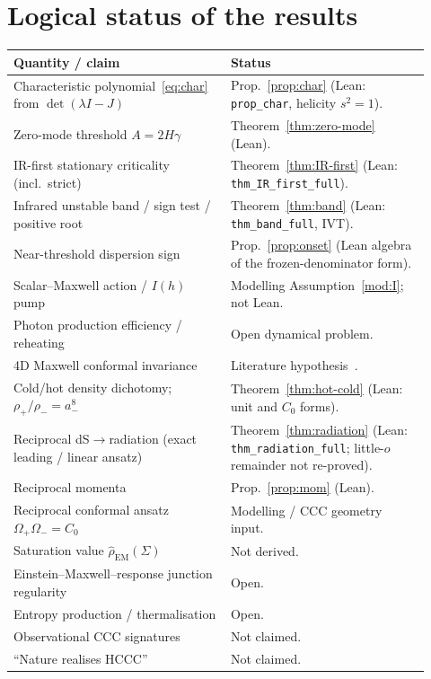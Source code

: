 \documentclass[11pt]{article}
\theoremstyle{definition}
\theoremstyle{remark}
\begin{document}
\section{Logical status of the results}
\label{sec:status}
\begin{center}
\small
\begin{tabular}{@{}p{0.48\linewidth}p{0.44\linewidth}@{}}
\toprule
\textbf{Quantity / claim} & \textbf{Status}\\
\midrule
Characteristic polynomial~\eqref{eq:char} from $\det(\lambda I-J)$ & Prop.~\ref{prop:char} (Lean: \texttt{prop\_char}, helicity $s^2=1$).\\
Zero-mode threshold $A=2H\gamma$ & Theorem~\ref{thm:zero-mode} (Lean).\\
IR-first stationary criticality (incl.\ strict) & Theorem~\ref{thm:IR-first} (Lean: \texttt{thm\_IR\_first\_full}).\\
Infrared unstable band / sign test / positive root & Theorem~\ref{thm:band} (Lean: \texttt{thm\_band\_full}, IVT).\\
Near-threshold dispersion sign & Prop.~\ref{prop:onset} (Lean algebra of the frozen-denominator form).\\
Scalar--Maxwell action / $I(h)$ pump & Modelling Assumption~\ref{mod:I}; not Lean.\\
Photon production efficiency / reheating & Open dynamical problem.\\
4D Maxwell conformal invariance & Literature hypothesis~\cite{Wald1984}.\\
Cold/hot density dichotomy; $\rho_+/\rho_-=a_-^{8}$ & Theorem~\ref{thm:hot-cold} (Lean: unit and $C_0$ forms).\\
Reciprocal dS$\to$radiation (exact leading / linear ansatz) & Theorem~\ref{thm:radiation} (Lean: \texttt{thm\_radiation\_full}; little-$o$ remainder not re-proved).\\
Reciprocal momenta & Prop.~\ref{prop:mom} (Lean).\\
Reciprocal conformal ansatz $\Omega_+\Omega_-=C_0$ & Modelling / CCC geometry input.\\
Saturation value $\hat\rho_{\mathrm{EM}}(\Sigma)$ & Not derived.\\
Einstein--Maxwell--response junction regularity & Open.\\
Entropy production / thermalisation & Open.\\
Observational CCC signatures & Not claimed.\\
``Nature realises HCCC'' & Not claimed.\\
\bottomrule
\end{tabular}
\end{center}
\end{document}
